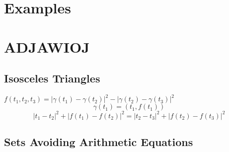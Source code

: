 \documentclass[12pt,reqno]{article}
\numberwithin{equation}{section}
\DeclareMathOperator{\RR}{\mathbf{R}}
\newtheorem{theorem}{Theorem}
\numberwithin{theorem}{section}
\begin{document}

\section{Examples}

\section{ADJAWIOJ}

\subsection{Isosceles Triangles}

$f(t_1,t_2,t_3) = |\gamma(t_1) - \gamma(t_2)|^2 - |\gamma(t_2) - \gamma(t_3)|^2$
\[ \gamma(t_1) = (t_1,f(t_1)) \]
\[ |t_1 - t_2|^2 + |f(t_1) - f(t_2)|^2 = |t_2 - t_3|^2 + |f(t_2) - f(t_3)|^2 \]

\subsection{Sets Avoiding Arithmetic Equations}
\end{document}

